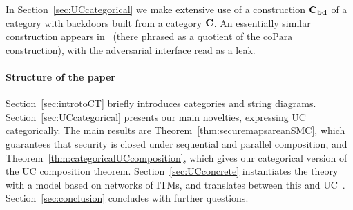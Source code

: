 In Section~\ref{sec:UCcategorical} we make extensive use of a construction $\mathbf{C_{bd}}$ of a category with backdoors built from a category $\mathbf{C}$. An essentially similar construction appears in~\cite{VDS:leakage} (there phrased as a quotient of the $\mathrm{coPara}$ construction), with the adversarial interface read as a leak.

\paragraph*{Structure of the paper} Section~\ref{sec:introtoCT} briefly introduces categories and string diagrams. Section~\ref{sec:UCcategorical} presents our main novelties, expressing UC categorically. The main results are Theorem~\ref{thm:securemapsareanSMC}, which guarantees that security is closed under sequential and parallel composition, and Theorem~\ref{thm:categoricalUCcomposition}, which gives our categorical version of the UC composition theorem. Section~\ref{sec:UCconcrete} instantiates the theory with a model based on networks of ITMs, and translates between this and UC~\cite[Section~2]{Can20}. Section~\ref{sec:conclusion} concludes with further questions.